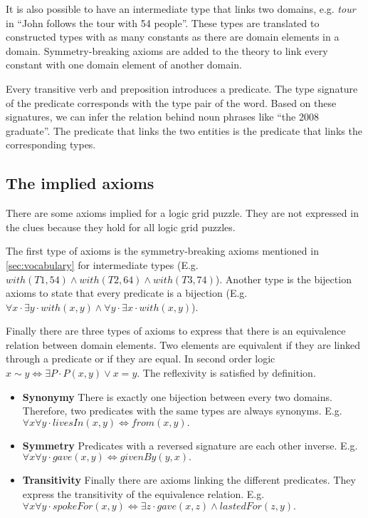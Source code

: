 It is also possible to have an intermediate type that links two domains, e.g. \textit{tour} in ``John follows the tour with 54 people''. These types are translated to constructed types with as many constants as there are domain elements in a domain. Symmetry-breaking axioms are added to the theory to link every constant with one domain element of another domain.

Every transitive verb and preposition introduces a predicate. The type signature of the predicate corresponds with the type pair of the word.  Based on these signatures, we can infer the relation behind noun phrases like ``the 2008 graduate''. The predicate that links the two entities is the predicate that links the corresponding types. %

\subsection{The implied axioms}
There are some axioms implied for a logic grid puzzle. They are not expressed in the clues because they hold for all logic grid puzzles.

The first type of axioms is the symmetry-breaking axioms mentioned in \ref{sec:vocabulary} for intermediate types (E.g. $with(T1, 54) \land with(T2, 64) \land with(T3, 74)$). Another type is the bijection axioms to state that every predicate is a bijection (E.g. $\forall x \cdot \exists y \cdot with(x, y) \land \forall y \cdot \exists x \cdot with(x, y)$).

Finally there are three types of axioms to express that there is an equivalence relation between domain elements. Two elements are equivalent if they are linked through a predicate or if they are equal. In second order logic $x \sim y \Leftrightarrow \exists P \cdot P(x, y) \lor x = y$. The reflexivity is satisfied by definition.

\begin{itemize}
  \item \textbf{Synonymy} There is exactly one bijection between every two domains. Therefore, two predicates with the same types are always synonyms. E.g. $\forall x \forall y \cdot livesIn(x, y) \Leftrightarrow from(x, y).$
  \item \textbf{Symmetry} Predicates with a reversed signature are each other inverse. E.g. $\forall x \forall y \cdot gave(x, y) \Leftrightarrow givenBy(y, x).$
  \item \textbf{Transitivity} Finally there are axioms linking the different predicates. They express the transitivity of the equivalence relation. E.g. $\forall x \forall y \cdot spokeFor(x, y) \Leftrightarrow \exists z \cdot gave(x, z) \land lastedFor(z, y).$
\end{itemize}
